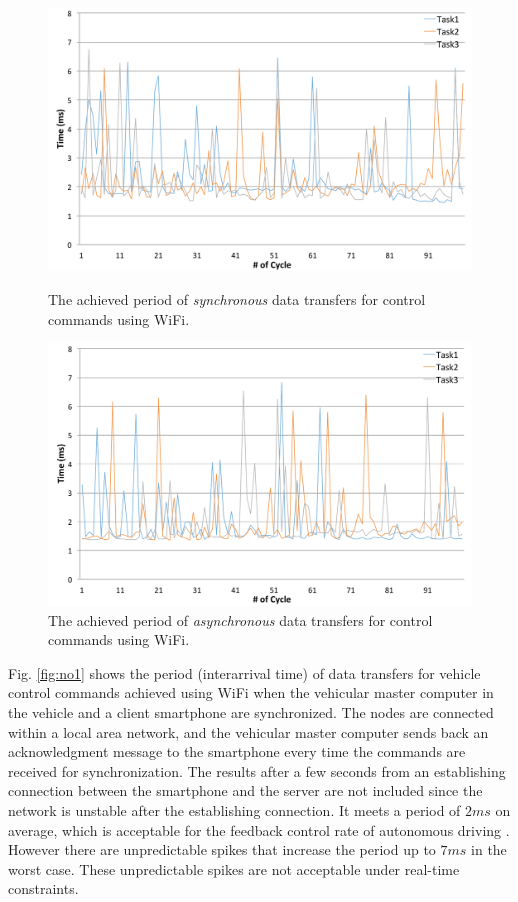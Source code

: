 \begin{figure}[!t]
 \centering
 \includegraphics[width=0.8\hsize]{fig/No1_Andrive_serv_cycle_WiFi.pdf}
 \caption{The achieved period of \textit{synchronous} data transfers for
 control commands using WiFi.}
 \label{fig:no1}
 \vspace{1em}
 \includegraphics[width=0.8\hsize]{fig/No4_Andrive_serv_cycle_WiFi_only_send.pdf}
 \caption{The achieved period of \textit{asynchronous} data transfers
 for control commands using WiFi.}
 \label{fig:no4}
\end{figure}

Fig. \ref{fig:no1} shows the period (interarrival time) of data
transfers for vehicle control commands achieved using WiFi when the
vehicular master computer in the vehicle and a client smartphone are
synchronized.
The nodes are connected within a local area network, and the vehicular
master computer sends back an acknowledgment message to the smartphone
every time the commands are received for synchronization.
The results after a few seconds from an establishing connection between the smartphone and the server are not included
since the network is unstable after the establishing connection.
It meets a period of $2ms$ on average, which is acceptable for the
feedback control rate of autonomous driving \cite{Kagami13}.
However there are unpredictable spikes that increase the period up to
$7ms$ in the worst case.
These unpredictable spikes are not acceptable under real-time
constraints.

